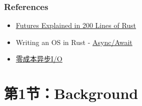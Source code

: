 %
\begin{frame}[fragile]
    \frametitle{References}
    \begin{itemize}
        \item \href{https://cfsamson.github.io/books-futures-explained/}{Futures Explained in 200 Lines of Rust}
        \item Writing an OS in Rust - \href{https://os.phil-opp.com/async-await/}{Async/Await}
        \item \href{https://zhuanlan.zhihu.com/p/97574385}{零成本异步I/O}
    \end{itemize}
\end{frame}
% 
% 
\section{第1节：Background} %
